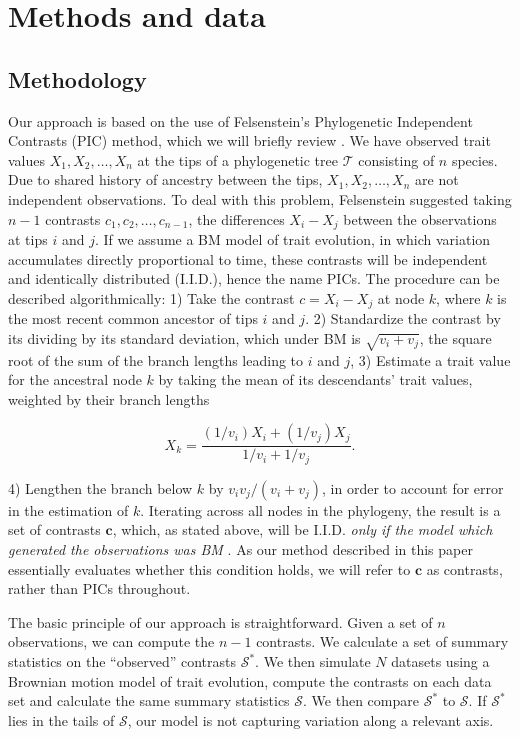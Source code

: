 \documentclass[12pt]{article}
\begin{document}
\section{Methods and data}

\subsection{Methodology}

Our approach is based on the use of Felsenstein's  Phylogenetic Independent Contrasts (PIC) method, which we will briefly review \citep[for more details, see][]{Felsenstein1985, Rohlf2001, Blomberg2012}. We have observed trait values $X_1, X_2, \ldots, X_n$ at the tips of a phylogenetic tree $\mathcal{T}$ consisting of $n$ species. Due to shared history of ancestry between the tips, $X_1, X_2, \ldots, X_n$ are not independent observations. To deal with this problem, Felsenstein suggested taking $n-1$ contrasts $c_1, c_2, \ldots, c_{n-1}$, the differences $X_{i} - X_{j}$ between the observations at tips $i$ and $j$. If we assume a BM model of trait evolution, in which variation accumulates directly proportional to time, these contrasts will be independent and identically distributed (I.I.D.), hence the name PICs. The procedure can be described algorithmically: 1) Take the contrast $c = X_i - X_j$ at node $k$, where $k$ is the most recent common ancestor of tips $i$ and $j$. 2) Standardize the contrast by its dividing by its standard deviation, which under BM is $\sqrt{v_i + v_j}$, the square root of the sum of the branch lengths leading to $i$ and $j$, 3) Estimate a trait value for the ancestral node $k$ by taking the mean of its descendants' trait values, weighted by their branch lengths

\begin{equation}
X_k = \frac{(1 / v_i)X_i + (1 / v_j)X_j}{1/v_i + 1/v_j}.
\end{equation}

4) Lengthen the branch below $k$ by $v_i v_j / (v_i + v_j)$, in order to account for error in the estimation of $k$. Iterating across all nodes in the phylogeny, the result is a set of contrasts $\mathbf{c}$, which, as stated above, will be I.I.D. \textit{only if the model which generated the observations was BM} \citep{Rohlf2001}. As our method described in this paper essentially evaluates whether this condition holds, we will refer to $\mathbf{c}$ as contrasts, rather than PICs throughout. 

The basic principle of our approach is straightforward. Given a set of $n$ observations, we can compute the $n-1$ contrasts. We calculate a set of summary statistics on the ``observed'' contrasts $\mathcal{S}^*$. We then simulate $N$ datasets using a Brownian motion model of trait evolution, compute the contrasts on each data set and calculate the same summary statistics $\mathcal{S}$. We then compare $\mathcal{S}^*$ to $\mathcal{S}$. If $\mathcal{S}^*$ lies in the tails of $\mathcal{S}$, our model is not capturing variation along a relevant axis. 
\end{document}
